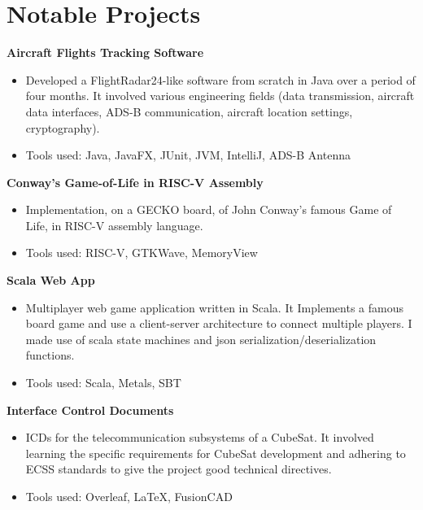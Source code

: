 \documentclass[a4paper, 10pt]{article}
\newenvironment{highlights}{
    \begin{itemize}[
        topsep=0.10 cm,
        parsep=0.10 cm,
        partopsep=0pt,
        itemsep=0pt,
        leftmargin=0.4 cm + 10pt
    ]
}{
    \end{itemize}
} %
\let\hrefWithoutArrow\href
\renewcommand{\href}[2]{\hrefWithoutArrow{#1}{\ifthenelse{\equal{#2}{}}{ }{#2 }\raisebox{.15ex}{\footnotesize \faExternalLink*}}}
\begin{document}
    
    \section{Notable Projects}

        \textbf{Aircraft Flights Tracking Software}\href{https://github.com/relogamimano/Javions}{}
        \begin{highlights}
            \item Developed a FlightRadar24-like software from scratch in Java over a period of four months. It involved various
            engineering fields (data transmission, aircraft data interfaces, ADS-B communication, aircraft location settings, cryptography).
            \item Tools used: Java, JavaFX, JUnit, JVM, IntelliJ, ADS-B Antenna
        \end{highlights}

        \textbf{Conway's Game-of-Life in RISC-V Assembly}\href{https://github.com/relogamimano/Conway-s-Game-of-Life-in-RISC-V-Assembly}{}
        \begin{highlights}
            \item Implementation, on a GECKO board, of John Conway's famous Game of Life, in RISC-V assembly language.
            \item Tools used: RISC-V, GTKWave, MemoryView
        \end{highlights}
        \textbf{Scala Web App}\href{https://github.com/relogamimano/Scala-Web-App}{}
        \begin{highlights}
            \item Multiplayer web game application written in Scala. It Implements a famous board game and use a client-server architecture to connect multiple players. I made use of scala state machines and json serialization/deserialization functions.
            \item Tools used: Scala, Metals, SBT
        \end{highlights}

        \textbf{Interface Control Documents}\href{https://drive.google.com/drive/folders/1KWNjMkGwcYpTIh6xBs-nddBK195R_ihb?usp=sharing}{}
        \begin{highlights}
            \item ICDs for the telecommunication subsystems of a CubeSat. It involved learning the specific requirements for CubeSat development and adhering to ECSS standards to give the project good technical directives.
            \item Tools used: Overleaf, LaTeX, FusionCAD
        \end{highlights}
\end{document}
